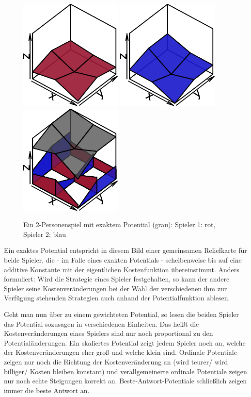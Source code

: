 \begin{figure}[h]\centering
	\includegraphics[width=.3\textwidth]{../Bilder/exaktesPotentialSp1.pdf}
	\includegraphics[width=.3\textwidth]{../Bilder/exaktesPotentialSp2.pdf}
	\includegraphics[width=.3\textwidth]{../Bilder/exaktesPotential.pdf}
	\caption{Ein 2-Personenspiel mit exaktem Potential (grau): Spieler 1: rot, Spieler 2: blau}
\end{figure}

Ein exaktes Potential entspricht in diesem Bild einer gemeinsamen Reliefkarte für beide Spieler, die - im Falle eines exakten Potentials - \glqq scheibenweise\grqq{} bis auf eine additive Konstante mit der eigentlichen Kostenfunktion übereinstimmt. Anders formuliert: Wird die Strategie eines Spieler festgehalten, so kann der andere Spieler seine Kostenveränderungen bei der Wahl der verschiedenen ihm zur Verfügung stehenden Strategien auch anhand der Potentialfunktion ablesen. 

Geht man nun über zu einem gewichteten Potential, so lesen die beiden Spieler das Potential sozusagen in verschiedenen Einheiten. Das heißt die Kostenveränderungen eines Spielers sind nur noch proportional zu den Potentialänderungen. Ein skaliertes Potential zeigt jedem Spieler noch an, welche der Kostenveränderungen eher groß und welche klein sind. Ordinale Potentiale zeigen nur noch die Richtung der Kostenveränderung an (\glqq wird teurer\grqq / \glqq wird billiger\grqq / \glqq Kosten bleiben konstant\grqq) und verallgemeinerte ordinale Potentiale zeigen nur noch echte Steigungen korrekt an. Beste-Antwort-Potentiale schließlich zeigen immer die beste Antwort an.


